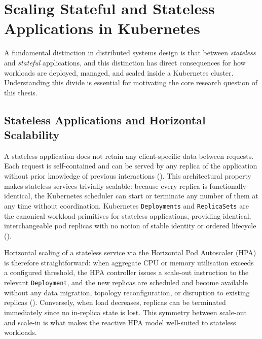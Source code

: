 
\newpage

\section{Scaling Stateful and Stateless Applications in Kubernetes}
\label{sec:stateful-vs-stateless}

A fundamental distinction in distributed systems design is that between
\textit{stateless} and \textit{stateful} applications, and this distinction has
direct consequences for how workloads are deployed, managed, and scaled inside
a Kubernetes cluster. Understanding this divide is essential for motivating the
core research question of this thesis.

\subsection{Stateless Applications and Horizontal Scalability}
\label{subsec:stateless-scaling}

A stateless application does not retain any client-specific data between
requests. Each request is self-contained and can be served by any replica of
the application without prior knowledge of previous interactions
(\cite{redhat:statefulvsstateless}). This architectural property makes stateless
services trivially scalable: because every replica is functionally identical,
the Kubernetes scheduler can start or terminate any number of them at any time
without coordination. Kubernetes \texttt{Deployments} and
\texttt{ReplicaSets} are the canonical workload primitives for stateless
applications, providing identical, interchangeable pod replicas with no notion
of stable identity or ordered lifecycle (\cite{kubernetes:statefulsets}).

Horizontal scaling of a stateless service via the Horizontal Pod Autoscaler
(HPA) is therefore straightforward: when aggregate CPU or memory utilisation
exceeds a configured threshold, the HPA controller issues a scale-out
instruction to the relevant \texttt{Deployment}, and the new replicas are
scheduled and become available without any data migration, topology
reconfiguration, or disruption to existing replicas (\cite{kubernetes:autoscaling}).
Conversely, when load decreases, replicas can be terminated immediately since
no in-replica state is lost. This symmetry between scale-out and scale-in is
what makes the reactive HPA model well-suited to stateless workloads.

